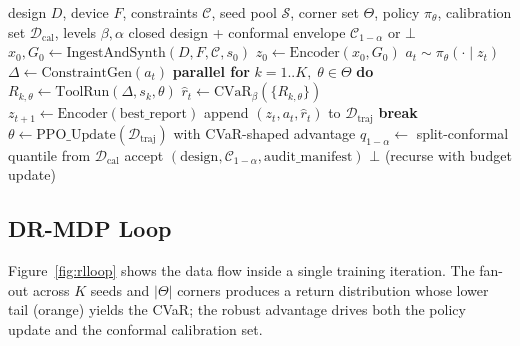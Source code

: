 \documentclass[journal,onecolumn=false]{IEEEtran}
\begin{document}
\begin{algorithm}[t]
\caption{\textsc{Robin-FPGA} episode}
\label{alg:robin}
\begin{algorithmic}[1]
\Require design $D$, device $F$, constraints $\mathcal{C}$, seed pool $\mathcal{S}$, corner set $\Theta$, policy $\pi_\theta$, calibration set $\mathcal{D}_{\text{cal}}$, levels $\beta, \alpha$
\Ensure closed design + conformal envelope $\mathcal{C}_{1-\alpha}$ or $\bot$
\State $x_0, G_0 \gets \mathrm{IngestAndSynth}(D, F, \mathcal{C}, s_0)$
\State $z_0 \gets \mathrm{Encoder}(x_0, G_0)$
  \State $a_t \sim \pi_\theta(\cdot \mid z_t)$
  \State $\Delta \gets \mathrm{ConstraintGen}(a_t)$
  \State \textbf{parallel for} $k = 1..K,\; \theta \in \Theta$ \textbf{do}
  \State \quad $R_{k,\theta} \gets \mathrm{ToolRun}(\Delta, s_k, \theta)$
  \State $\hat{r}_t \gets \mathrm{CVaR}_{\beta}(\{R_{k,\theta}\})$ 
  \State $z_{t+1} \gets \mathrm{Encoder}(\mathrm{best\_report})$
  \State append $(z_t, a_t, \hat r_t)$ to $\mathcal{D}_{\text{traj}}$
   \textbf{break} \EndIf
\EndFor
\State $\theta \gets \mathrm{PPO\_Update}(\mathcal{D}_{\text{traj}})$ with CVaR-shaped advantage 
\State $q_{1-\alpha} \gets$ split-conformal quantile from $\mathcal{D}_{\text{cal}}$ 
  \State \Return accept $(\text{design}, \mathcal{C}_{1-\alpha}, \text{audit\_manifest})$
\Else
  \State \Return $\bot$ (recurse with budget update)
\EndIf
\end{algorithmic}
\end{algorithm}

\subsection{DR-MDP Loop}
Figure~\ref{fig:rlloop} shows the data flow inside a single training iteration. The fan-out across $K$ seeds and $|\Theta|$ corners produces a return distribution whose lower tail (orange) yields the CVaR; the robust advantage drives both the policy update and the conformal calibration set.
\end{document}
